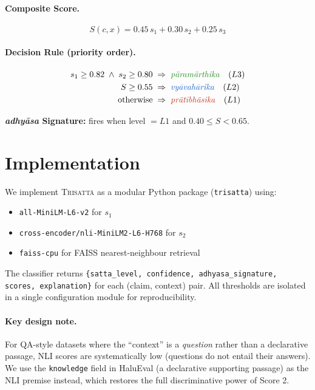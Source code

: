\documentclass[11pt]{article}
\newcommand{\param}{\textcolor{paramcol}{\textit{pāramārthika}}}
\newcommand{\vyav}{\textcolor{vyavcol}{\textit{vyāvahārika}}}
\newcommand{\prati}{\textcolor{praticol}{\textit{prātibhāsika}}}
\newcommand{\adhyasa}{\textcolor{adhyasacol}{\textit{adhyāsa}}}
\newcommand{\system}{\textsc{Trisatt\={a}}}
\begin{document}
\paragraph{Composite Score.}
\begin{equation}
  S(c,x) = 0.45\,s_1 + 0.30\,s_2 + 0.25\,s_3
\end{equation}

\paragraph{Decision Rule (priority order).}
\begin{align}
  s_1 \geq 0.82 \;\wedge\; s_2 \geq 0.80 &\;\Rightarrow\; \text{\param{}} \quad (L3) \\
  S \geq 0.55                              &\;\Rightarrow\; \text{\vyav{}}  \quad (L2) \\
  \text{otherwise}                         &\;\Rightarrow\; \text{\prati{}} \quad (L1)
\end{align}

\noindent\textbf{\adhyasa{} Signature:} fires when level $= L1$ and $0.40 \leq S < 0.65$.

\section{Implementation}
\label{sec:impl}

We implement \system{} as a modular Python package (\texttt{trisatta}) using:

\begin{itemize}[leftmargin=*,noitemsep]
  \item \texttt{all-MiniLM-L6-v2} \cite{reimers2019sentencebert} for $s_1$
  \item \texttt{cross-encoder/nli-MiniLM2-L6-H768} for $s_2$
  \item \texttt{faiss-cpu} \cite{johnson2019billion} for FAISS nearest-neighbour retrieval
\end{itemize}

The classifier returns \texttt{\{satta\_level, confidence, adhyasa\_signature, scores, explanation\}} for each (claim, context) pair. All thresholds are isolated in a single configuration module for reproducibility.

\paragraph{Key design note.}
For QA-style datasets where the ``context'' is a \emph{question} rather than a
declarative passage, NLI scores are systematically low (questions do not entail
their answers). We use the \texttt{knowledge} field in HaluEval (a declarative
supporting passage) as the NLI premise instead, which restores the full
discriminative power of Score 2.
\end{document}
